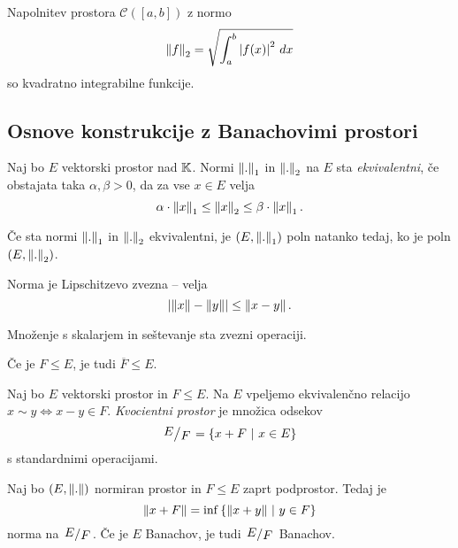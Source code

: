 \begin{zgled}
Napolnitev prostora $\mathcal{C}([a,b])$ z normo
\[
\left\lVert f\right\rVert_2 = \sqrt{\int_a^b \left\lvert f(x)\right\rvert^2\,dx}
\]
so kvadratno integrabilne funkcije.
\end{zgled}

\newpage

\subsection{Osnove konstrukcije z Banachovimi prostori}


\begin{definicija}
Naj bo $E$ vektorski prostor nad $\mathbb{K}$. Normi $\left\lVert .\right\rVert_1$ in
$\left\lVert .\right\rVert_2$ na $E$ sta
\emph{ekvivalentni}, če obstajata taka
$\alpha, \beta > 0$, da za vse $x \in E$ velja
\[
\alpha \cdot \left\lVert x\right\rVert_1 \leq \left\lVert x\right\rVert_2 \leq
\beta \cdot \left\lVert x\right\rVert_1.
\]
\end{definicija}

\begin{opomba}
Če sta normi $\left\lVert .\right\rVert_1$ in $\left\lVert .\right\rVert_2$ ekvivalentni, je
$(E, \left\lVert .\right\rVert_1)$ poln natanko tedaj, ko je poln $(E, \left\lVert .\right\rVert_2)$.
\end{opomba}

\begin{opomba}
Norma je Lipschitzevo zvezna -- velja
\[
\left\lvert \left\lVert x\right\rVert - \left\lVert y\right\rVert\right\rvert \leq \left\lVert x-y\right\rVert.
\]
\end{opomba}

\begin{opomba}
Množenje s skalarjem in seštevanje sta zvezni operaciji.
\end{opomba}

\begin{opomba}
Če je $F \leq E$, je tudi $\overline{F} \leq E$.
\end{opomba}

\begin{definicija}
Naj bo $E$ vektorski prostor in $F \leq E$. Na $E$ vpeljemo
ekvivalenčno relacijo $x \sim y \iff x-y \in F$.
\emph{Kvocientni prostor} je
množica odsekov
\[
\kvoc{E}{F} = \setb{x + F}{x \in E}
\]
s standardnimi operacijami.
\end{definicija}

\begin{trditev}
Naj bo $(E, \left\lVert .\right\rVert)$ normiran prostor in $F \leq E$ zaprt
podprostor. Tedaj je
\[
\left\lVert x + F\right\rVert = \inf \left\{\left\lVert x+y\right\rVert~\middle\vert~y \in F\right\}
\]
norma na $\kvoc{E}{F}$. Če je $E$ Banachov, je tudi $\kvoc{E}{F}$
Banachov.
\end{trditev}

